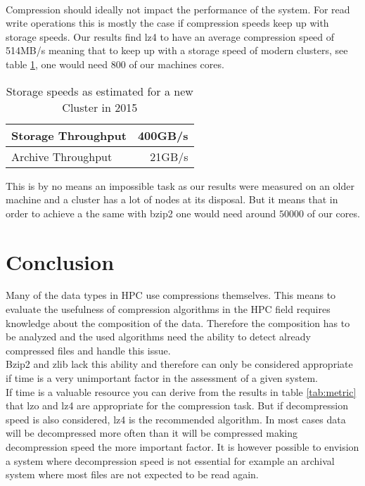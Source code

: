 \documentclass[
	12pt,
	a4paper,
	BCOR10mm,
	DIV14,
	listof=totoc,
	bibliography=totoc,
	headsepline
]{scrreprt}
\begin{document}
\\
Compression should ideally not impact the performance of the system.
For read write operations this is mostly the case if compression speeds keep up with storage speeds.
Our results find lz4 to have an average compression speed of 514MB/s meaning that to keep up with a storage speed of modern clusters, see table \ref{tab:storage_speeds}, one would need 800 of our machines cores.
\begin{table}[h]
\begin{center}
\begin{tabular}{|l|r|}
    \hline
    Storage Throughput & 400GB/s \\
    \hline
    Archive Throughput &  21GB/s \\
    \hline
\end{tabular}
\caption{Storage speeds as estimated for a new Cluster in 2015 \cite{ExaStoSy}}
\label{tab:storage_speeds}
\end{center}
\end{table}
\FloatBarrier

This is by no means an impossible task as our results were measured on an older machine and a cluster has a lot of nodes at its disposal. But it means that in order to achieve a the same with bzip2 one would need around $50000$ of our cores.
\\




\chapter{Conclusion}
\label{Conclusion}
Many of the data types in HPC use compressions themselves.
This means to evaluate the usefulness of compression algorithms in the HPC field requires knowledge about the composition of the data.
Therefore the composition has to be analyzed and the used algorithms need the ability to detect already compressed files and handle this issue.
\\
Bzip2 and zlib lack this ability and therefore can only be considered appropriate if time is a very unimportant factor in the assessment of a given system.
\\
If time is a valuable resource you can derive from the results in table \ref{tab:metric} that lzo and lz4 are appropriate for the compression task.
But if decompression speed is also considered, lz4 is the recommended algorithm.
In most cases data will be decompressed more often than it will be compressed making decompression speed the more important factor.
It is however possible to envision a system where decompression speed is not essential for example an archival system where most files are not expected to be read again.
\end{document}
